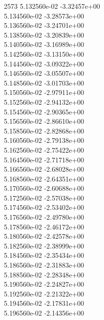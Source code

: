 2573	5.132560e-02	-3.32457e+00	\\ 	5.134560e-02	-3.28573e+00	\\ 	5.136560e-02	-3.24701e+00	\\ 	5.138560e-02	-3.20839e+00	\\ 	5.140560e-02	-3.16989e+00	\\ 	5.142560e-02	-3.13150e+00	\\ 	5.144560e-02	-3.09322e+00	\\ 	5.146560e-02	-3.05507e+00	\\ 	5.148560e-02	-3.01703e+00	\\ 	5.150560e-02	-2.97911e+00	\\ 	5.152560e-02	-2.94132e+00	\\ 	5.154560e-02	-2.90365e+00	\\ 	5.156560e-02	-2.86610e+00	\\ 	5.158560e-02	-2.82868e+00	\\ 	5.160560e-02	-2.79138e+00	\\ 	5.162560e-02	-2.75422e+00	\\ 	5.164560e-02	-2.71718e+00	\\ 	5.166560e-02	-2.68028e+00	\\ 	5.168560e-02	-2.64351e+00	\\ 	5.170560e-02	-2.60688e+00	\\ 	5.172560e-02	-2.57038e+00	\\ 	5.174560e-02	-2.53402e+00	\\ 	5.176560e-02	-2.49780e+00	\\ 	5.178560e-02	-2.46172e+00	\\ 	5.180560e-02	-2.42578e+00	\\ 	5.182560e-02	-2.38999e+00	\\ 	5.184560e-02	-2.35434e+00	\\ 	5.186560e-02	-2.31883e+00	\\ 	5.188560e-02	-2.28348e+00	\\ 	5.190560e-02	-2.24827e+00	\\ 	5.192560e-02	-2.21322e+00	\\ 	5.194560e-02	-2.17831e+00	\\ 	5.196560e-02	-2.14356e+00	\\ \hline
